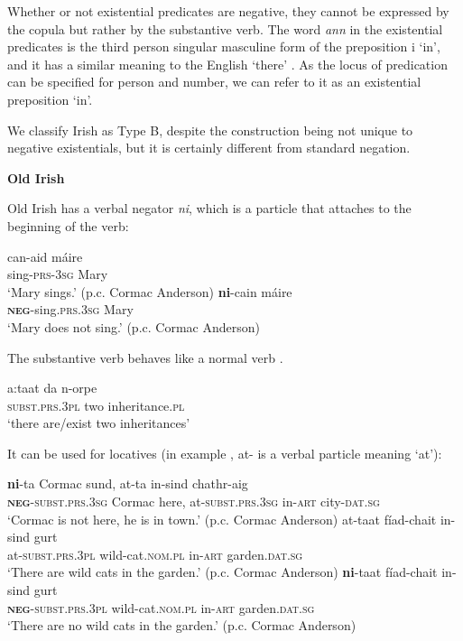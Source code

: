 ﻿\documentclass[output=paper]{langsci/langscibook}
\begin{document}
\begin{unindented}
Whether or not existential predicates are negative, they cannot be
expressed by the copula but rather by the substantive verb. The word
\textit{ann} in the existential predicates is the third person singular
masculine form of the preposition i `in', and it has a similar meaning to
the English `there' \parencite[see][11]{Stenson2008}. As the locus of predication can be specified for person and number, we can refer to it as an existential preposition `in'.

We classify Irish as Type B, despite the construction being not unique to negative existentials, but it is certainly different from standard negation.

\textbf{Old Irish}

Old Irish has a verbal negator \textit{ni}, which is a particle that attaches to the beginning of the verb: 
%
\begin{exe}\ex \gll can-aid máire \\
sing-\textsc{prs-3sg} Mary \\
    \glt `Mary sings.' (p.c. Cormac Anderson)
\ex \gll \textbf{ni}-cain máire \\
\textbf{\textsc{neg}}-sing.\textsc{prs.3sg} Mary \\
    \glt `Mary does not sing.' (p.c. Cormac Anderson)
    \end{exe} 

The substantive verb behaves like a normal verb \citep[40]{McCone2005}.
%
\begin{exe}\ex \gll a:taat da n-orpe \\
\textsc{subst.prs.3pl} two inheritance.\textsc{pl} \\
    \glt `there are/exist two inheritances' \citep[40]{McCone2005}
    \end{exe}

It can be used for locatives (in example , at- is a verbal particle meaning `at'):

\begin{exe}\ex
    \gll \textbf{ni}-ta Cormac sund,  at-ta in-sind chathr-aig \\
\textbf{\textsc{neg}}\textsc{-subst.prs.3sg} Cormac here,  at-\textsc{subst.prs.3sg} in-\textsc{art}  city-\textsc{dat.sg} \\
    \glt `Cormac is not here, he is in town.' (p.c. Cormac Anderson)
\ex\label{ex:ieur-app-irish-Cormac} 
    \gll at-taat fíad-chait in-sind gurt \\
at-\textsc{subst.prs.3pl} wild-cat.\textsc{nom.pl} in-\textsc{art} garden.\textsc{dat.sg} \\
    \glt `There are wild cats in the garden.' (p.c. Cormac Anderson)
\ex \gll \textbf{ni}-taat fíad-chait in-sind gurt \\
\textbf{\textsc{neg}}\textsc{-subst.prs.3pl} wild-cat.\textsc{nom.pl} in-\textsc{art} garden.\textsc{dat.sg} \\
    \glt `There are no wild cats in the garden.' (p.c. Cormac Anderson)
    \end{exe}


\end{unindented}
\end{document}
